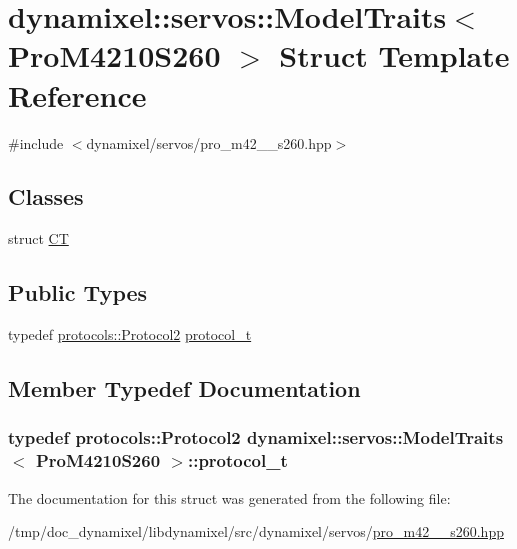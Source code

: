 \hypertarget{structdynamixel_1_1servos_1_1_model_traits_3_01_pro_m4210_s260_01_4}{}\section{dynamixel\+:\+:servos\+:\+:Model\+Traits$<$ Pro\+M4210\+S260 $>$ Struct Template Reference}
\label{structdynamixel_1_1servos_1_1_model_traits_3_01_pro_m4210_s260_01_4}


{\ttfamily \#include $<$dynamixel/servos/pro\+\_\+m42\+\_\+\_\+s260.\+hpp$>$}

\subsection*{Classes}
\begin{DoxyCompactItemize}
\item 
struct \hyperlink{structdynamixel_1_1servos_1_1_model_traits_3_01_pro_m4210_s260_01_4_1_1_c_t}{C\+T}
\end{DoxyCompactItemize}
\subsection*{Public Types}
\begin{DoxyCompactItemize}
\item 
typedef \hyperlink{classdynamixel_1_1protocols_1_1_protocol2}{protocols\+::\+Protocol2} \hyperlink{structdynamixel_1_1servos_1_1_model_traits_3_01_pro_m4210_s260_01_4_afb54d94276457bc64d630689dc1fb5fc}{protocol\+\_\+t}
\end{DoxyCompactItemize}


\subsection{Member Typedef Documentation}
\hypertarget{structdynamixel_1_1servos_1_1_model_traits_3_01_pro_m4210_s260_01_4_afb54d94276457bc64d630689dc1fb5fc}{}
\subsubsection[{protocol\+\_\+t}]{\setlength{\rightskip}{0pt plus 5cm}typedef {\bf protocols\+::\+Protocol2} {\bf dynamixel\+::servos\+::\+Model\+Traits}$<$ {\bf Pro\+M4210\+S260} $>$\+::{\bf protocol\+\_\+t}}\label{structdynamixel_1_1servos_1_1_model_traits_3_01_pro_m4210_s260_01_4_afb54d94276457bc64d630689dc1fb5fc}


The documentation for this struct was generated from the following file\+:\begin{DoxyCompactItemize}
\item 
/tmp/doc\+\_\+dynamixel/libdynamixel/src/dynamixel/servos/\hyperlink{pro__m42__10__s260_8hpp}{pro\+\_\+m42\+\_\+\_\+s260.\+hpp}\end{DoxyCompactItemize}
